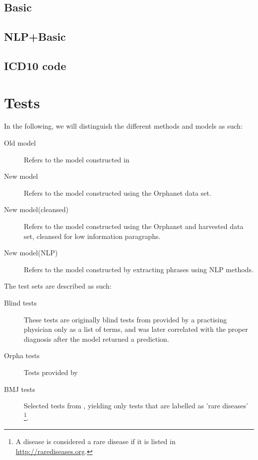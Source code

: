 \documentclass[10pt,letterpaper,final]{article}
\begin{document}
\subsection{Basic}


\subsection{NLP+Basic}


\subsection{ICD10 code}


\section{Tests}
\label{chap:test}
In the following, we will distinguish the different methods and models
as such:
\begin{description}
\item[Old model] Refers to the model constructed in
\cite{jensenandersen}
\item[New model] Refers to the model constructed using the Orphanet data
set.
\item[New model(cleansed)] Refers to the model constructed using the
Orphanet and harvested data set, cleansed for low information
paragraphs.
\item[New model(NLP)] Refers to the model constructed by extracting
phrases using NLP methods.
\end{description}

The test sets are described as such:
\begin{description}
\item[Blind tests] These tests are originally blind tests from
\cite{jensenandersen} provided by a practising physician only as a list
of terms, and was later correlated with the proper diagnosis after the
model returned a prediction.
\item[Orpha tests] Tests provided by 
\item[BMJ tests] Selected tests from \cite{googlingdiagnosis}, yielding
only tests that are labelled as 'rare diseases' \footnote{A disease is
considered a rare disease if it is listed in
\url{http://rarediseases.org}.}.
\end{description}


\end{document}

